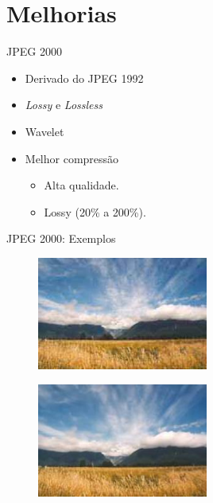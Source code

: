 \documentclass{beamer}
\begin{document}
\section{Melhorias}
\begin{frame}{JPEG 2000}
\begin{itemize}
   \item Derivado do JPEG 1992
   \item \emph{Lossy} e \emph{Lossless}
   \item Wavelet
   \item Melhor compressão
      \begin{itemize}
         \item Alta qualidade.
         \item Lossy (20\% a 200\%).
      \end{itemize}

\end{itemize}
\end{frame}
\begin{frame}{JPEG 2000: Exemplos}
   \begin{multicols}{2}
      \begin{figure}[h]
         \includegraphics[width=0.5\textwidth]{figure/ex_jpeg_01.jpg}
      \end{figure}
      \begin{figure}[h]
         \includegraphics[width=0.5\textwidth]{figure/ex_jpeg2k_01_2.jpg}
      \end{figure}
   \end{multicols}
\end{frame}
\end{document}
